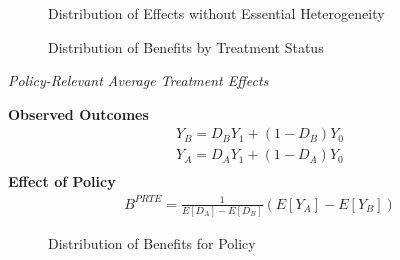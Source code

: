 \begin{frame}
	\begin{figure}\caption{Distribution of Effects without Essential Heterogeneity}
	\end{figure}
\end{frame}
\begin{frame}
	\begin{figure}\caption{Distribution of Benefits by Treatment Status}
	\end{figure}
\end{frame}
\begin{frame}\begin{center}
		\LARGE\textit{Policy-Relevant Average Treatment Effects}
\end{center}\end{frame}
\begin{frame}
	\textbf{Observed Outcomes}
	\begin{align*}
		Y_B = D_B Y_1 + (1 - D_B) Y_0 \\
		Y_A = D_A Y_1 + (1 - D_A) Y_0 \\
	\end{align*}
	\textbf{Effect of Policy}
	\begin{align*}
		B^{PRTE} = \frac{1}{E[D_A] - E[D_B]} (E[Y_A] - E[Y_B])
	\end{align*}
\end{frame}
\begin{frame}
	\begin{figure}\caption{Distribution of Benefits for Policy}
	\end{figure}
\end{frame}
